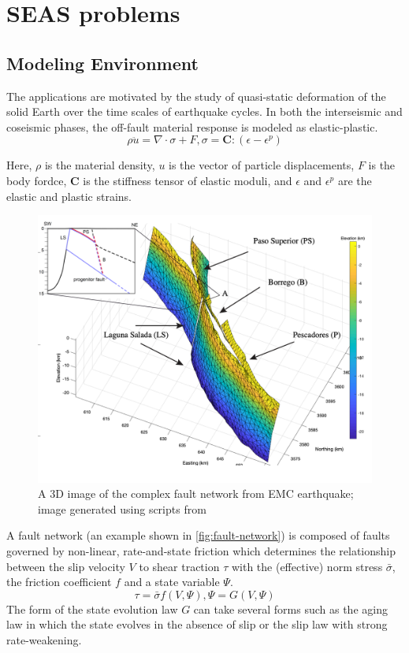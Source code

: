 \section{SEAS problems}
\subsection{Modeling Environment}
The applications are motivated by the study of quasi-static deformation of the solid Earth over the time scales of earthquake cycles.
In both the interseismic and coseismic phases, the off-fault material response is modeled as elastic-plastic.
\begin{equation}\label{eqn:governing}
    \rho \ddot{u} = \nabla \cdot \sigma + F, \sigma = \boldsymbol{C} : (\epsilon - \epsilon^p) 
\end{equation}

Here, $\rho$ is the material density, $u$ is the vector of particle displacements, $F$ is the body fordce, $\boldsymbol{C}$ is the stiffness tensor of elastic moduli, and $\epsilon$ and $\epsilon^p$ are the elastic and plastic strains.
\begin{figure}
    \centering
    \includegraphics[width=\linewidth]{figures/fault-network.png}
    \caption{A 3D image of the complex fault network from EMC earthquake; image generated using scripts from \citep{https://doi.org/10.1002/2016GL072289}}
    \label{fig:fault-network}
\end{figure}
A fault network (an example shown in \autoref{fig:fault-network}) is composed of faults governed by non-linear, rate-and-state friction which determines the relationship between the slip velocity $V$ to shear traction $\tau$ with the (effective) norm stress $\bar{\sigma}$, the friction coefficient $f$ and a state variable $\Psi$.
\begin{equation}\label{eqn:friction-law}
    \tau = \bar{\sigma} f(V,\Psi), \Psi = G(V, \Psi)
\end{equation}
The form of the state evolution law $G$ can take several forms such as the aging law in which the state evolves in the absence of slip or the slip law with strong rate-weakening.

